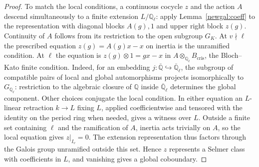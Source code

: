 \begin{proof}
To match the local conditions, a continuous cocycle $z$ and the action
$A$ descend simultaneously to a finite extension $L/\mathbb Q_\ell$:
apply Lemma~\ref{newgal:coeff} to the representation with diagonal
blocks $A(g),1$ and upper right block $z(g)$. Continuity of $A$ follows
from its restriction to the open subgroup $G_K$. At $v\nmid\ell$
the prescribed equation $z(g)=A(g)x-x$ on inertia is the unramified
condition. At $\ell$ the equation is $z(g)\otimes1=gx-x$ in
$A\otimes_{\mathbb Q_\ell}B_{\mathrm{cris}}$, the Bloch--Kato finite
condition. Indeed, for an embedding
$j:\overline{\mathbb Q}\hookrightarrow\overline{\mathbb Q}_\ell$,
the subgroup of compatible pairs of local and global automorphisms
projects isomorphically to $G_{\mathbb Q_\ell}$: restriction to the
algebraic closure of $\mathbb Q$ inside $\overline{\mathbb Q}_\ell$
determines the global component. Other choices conjugate the local
condition. In either equation an $L$-linear retraction $k\to L$
fixing $L$, applied coefficientwise and tensored with the identity
on the period ring when needed, gives a witness over $L$. Outside a
finite set containing $\ell$ and the ramification of $A$, inertia
acts trivially on $A$, so the local equation gives $z|_{I_v}=0$.
The extension representation thus factors through the Galois group
unramified outside this set. Hence $z$ represents a Selmer class with
coefficients in $L$, and vanishing gives a global coboundary.
\end{proof}

